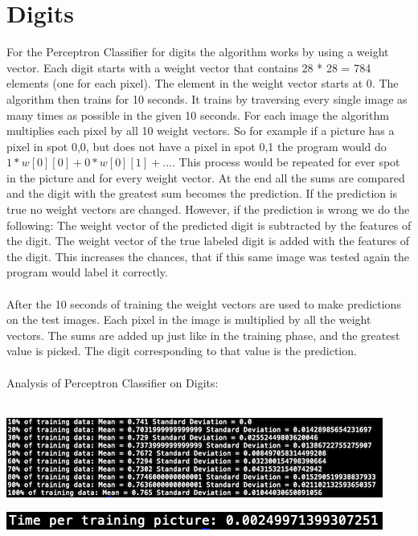 \documentclass[12pt]{article}
\begin{document}
\section*{Digits}
For the Perceptron Classifier for digits the algorithm works by using a weight vector. Each digit starts with a weight vector that contains 28 * 28 = 784 elements (one for each pixel). The element in the weight vector starts at 0. The algorithm then trains for 10 seconds. It trains by traversing every single image as many times as possible in the given 10 seconds. For each image the algorithm multiplies each pixel by all 10 weight vectors. So for example if a picture has a pixel in spot 0,0, but does not have a pixel in spot 0,1 the program would do $1 * w[0][0] + 0 * w[0][1] + ...$. This process would be repeated for ever spot in the picture and for every weight vector. At the end all the sums are compared and the digit with the greatest sum becomes the prediction. If the prediction is true no weight vectors are changed. However, if the prediction is wrong we do the following: The weight vector of the predicted digit is subtracted by the features of the digit. The weight vector of the true labeled digit is added with the features of the digit. This increases the chances, that if this same image was tested again the program would label it correctly.\\\\
After the 10 seconds of training the weight vectors are used to make predictions on the test images. Each pixel in the image is multiplied by all the weight vectors. The sums are added up just like in the training phase, and the greatest value is picked. The digit corresponding to that value is the prediction.\\\\
Analysis of Perceptron Classifier on Digits:\\\\

\begin{center}
\includegraphics{statsDigPerceptron.png}
\end{center}

\begin{center}
\includegraphics{timeStatsDigPerceptron.png}
\end{center}
\end{document}
